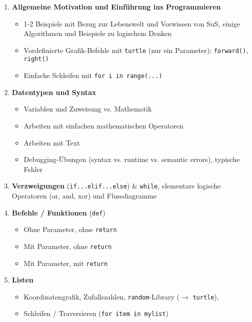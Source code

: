 \begin{overviewBox}[title=Überblick der Themen]
    \begin{enumerate}
    \item \textbf{Allgemeine Motivation und Einführung ins Programmieren}
    \begin{itemize}
        \item 1-2 Beispiele mit Bezug zur Lebenswelt und Vorwissen von SuS, einige Algorithmen und Beispiele zu logischem Denken
        \item Vordefinierte Grafik-Befehle mit \lstinline|turtle| (nur ein Parameter): \lstinline|forward()|, \lstinline|right()|
        \item Einfache Schleifen mit \lstinline|for i in range(...)|
    \end{itemize}
    \item \textbf{Datentypen und Syntax}
    \begin{itemize}
        \item Variablen und Zuweisung vs. Mathematik
        \item Arbeiten mit einfachen mathematischen Operatoren
        \item Arbeiten mit Text
        \item Debugging-Übungen (syntax vs. runtime vs. semantic errors), typische Fehler
    \end{itemize}
    \item \textbf{Verzweigungen} (\lstinline|if...elif...else|) \& \lstinline|while|,  elementare logische Operatoren (or, and, xor)  und Flussdiagramme
    \item \textbf{Befehle / Funktionen} (\lstinline|def|)
    \begin{itemize}
        \item Ohne Parameter, ohne \lstinline|return|
        \item Mit Parameter, ohne \lstinline|return|
        \item Mit Parameter, mit \lstinline|return|
    \end{itemize}
    \item \textbf{Listen}
    \begin{itemize}
        \item  Koordinatengrafik, Zufallszahlen, \lstinline|random|-Library ($\rightarrow$ \lstinline|turtle|), \item Schleifen / Traversieren (\lstinline|for item in mylist|)
    \end{itemize}
\end{enumerate}
\end{overviewBox}


